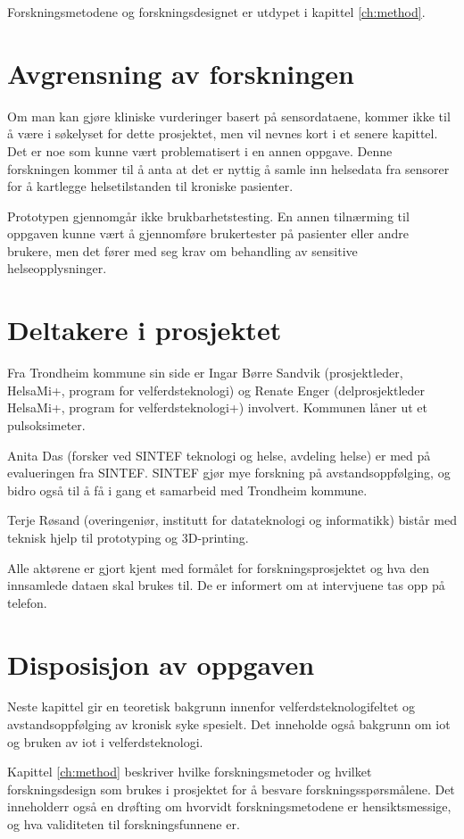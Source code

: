 Forskningsmetodene og forskningsdesignet er utdypet i kapittel \ref{ch:method}.

\section{Avgrensning av forskningen}
Om man kan gjøre kliniske vurderinger basert på sensordataene, kommer ikke til å være i søkelyset for dette prosjektet,
men vil nevnes kort i et senere kapittel. Det er noe som kunne vært problematisert i en annen oppgave.
Denne forskningen kommer til å anta at det er nyttig å samle inn helsedata fra sensorer for å kartlegge helsetilstanden til kroniske pasienter.

Prototypen gjennomgår ikke brukbarhetstesting. En annen tilnærming til oppgaven kunne vært å gjennomføre brukertester på pasienter eller andre brukere, men det
fører med seg krav om behandling av sensitive helseopplysninger. 

\section{Deltakere i prosjektet}
Fra Trondheim kommune sin side er Ingar Børre Sandvik (prosjektleder, HelsaMi+, program for velferdsteknologi) og Renate Enger
(delprosjektleder HelsaMi+, program for velferdsteknologi+) involvert. Kommunen låner ut et pulsoksimeter.

Anita Das (forsker ved SINTEF teknologi og helse, avdeling helse) er med på evalueringen fra SINTEF. SINTEF gjør mye forskning på
avstandsoppfølging, og bidro også til å få i gang et samarbeid med Trondheim kommune.

Terje Røsand (overingeniør, institutt for datateknologi og informatikk) bistår med teknisk hjelp til prototyping og 3D-printing.

Alle aktørene er gjort kjent med formålet for forskningsprosjektet og hva den innsamlede dataen skal brukes til. De er informert om at
intervjuene tas opp på telefon.

\section{Disposisjon av oppgaven}
Neste kapittel gir en teoretisk bakgrunn innenfor velferdsteknologifeltet og avstandsoppfølging av kronisk syke spesielt.
Det inneholde også bakgrunn om \gls{iot} og bruken av \gls{iot} i velferdsteknologi.

Kapittel \ref{ch:method} beskriver hvilke forskningsmetoder og hvilket forskningsdesign som brukes i prosjektet for å besvare forskningsspørsmålene. 
Det inneholderr også en drøfting om hvorvidt forskningsmetodene er hensiktsmessige, og hva validiteten til forskningsfunnene er.

